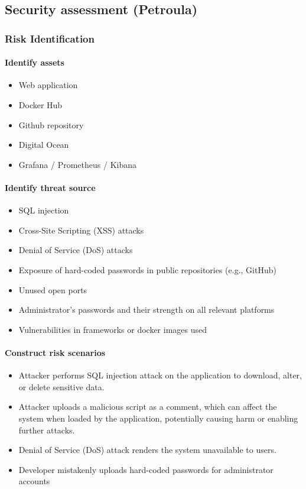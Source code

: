\documentclass{article}
\begin{document}
\subsection{Security assessment (Petroula)}
	\subsubsection{Risk Identification}
	\paragraph{Identify assets}
	\begin{itemize}
		\item Web application
		\item Docker Hub
		\item Github repository
		\item Digital Ocean
		\item Grafana / Prometheus / Kibana
	\end{itemize}
	\paragraph{Identify threat source}
	\begin{itemize}
		\item SQL injection 
		\item Cross-Site Scripting (XSS) attacks
		\item Denial of Service (DoS) attacks
		\item Exposure of hard-coded passwords in public repositories (e.g., GitHub)
		\item Unused open ports
		\item Administrator’s passwords and their strength on all relevant platforms
		\item Vulnerabilities in frameworks or docker images used
	\end{itemize}
	\paragraph{Construct risk scenarios}
	\begin{itemize}
		\item Attacker performs SQL injection attack on the application to download, alter, or delete sensitive data.
		\item Attacker uploads a malicious script as a comment, which can affect the system when loaded by the application, potentially causing harm or enabling further attacks.
		\item Denial of Service (DoS) attack renders the system unavailable to users.
		\item Developer mistakenly uploads hard-coded passwords for administrator accounts
	\end{itemize}
\end{document}
